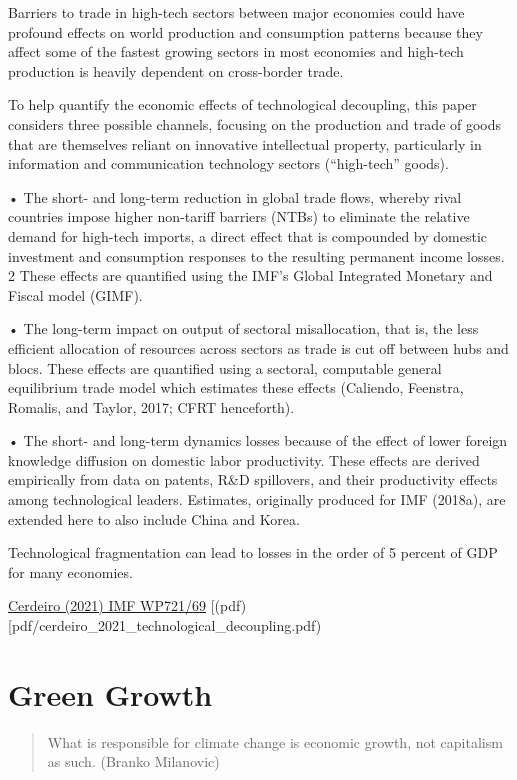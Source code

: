 \documentclass[
]{book}
\begin{document}
Barriers to trade in high-tech sectors
between major economies could have
profound effects on world production
and consumption patterns because they
affect some of the fastest growing
sectors in most economies and high-tech
production is heavily dependent on
cross-border trade.

To help quantify the economic effects of technological decoupling, this paper considers three
possible channels, focusing on the production and trade of goods that are themselves reliant on
innovative intellectual property, particularly in information and communication technology
sectors (``high-tech'' goods).

• The short- and long-term reduction in global trade flows, whereby rival countries impose
higher non-tariff barriers (NTBs) to eliminate the relative demand for high-tech imports,
a direct effect that is compounded by domestic investment and consumption responses to
the resulting permanent income losses. 2 These effects are quantified using the IMF's
Global Integrated Monetary and Fiscal model (GIMF).

• The long-term impact on output of sectoral misallocation, that is, the less efficient
allocation of resources across sectors as trade is cut off between hubs and blocs. These
effects are quantified using a sectoral, computable general equilibrium trade model which
estimates these effects (Caliendo, Feenstra, Romalis, and Taylor, 2017; CFRT
henceforth).

• The short- and long-term dynamics losses because of the effect of lower foreign
knowledge diffusion on domestic labor productivity. These effects are derived empirically
from data on patents, R\&D spillovers, and their productivity effects among technological
leaders. Estimates, originally produced for IMF (2018a), are extended here to also
include China and Korea.

Technological fragmentation can lead to losses in the order of 5 percent of GDP for many economies.

\href{https://www.imf.org/en/Publications/WP/Issues/2021/03/12/Sizing-Up-the-Effects-of-Technological-Decoupling-50125}{Cerdeiro (2021) IMF WP721/69}
{[}(pdf){[}pdf/cerdeiro\_2021\_technological\_decoupling.pdf)

\hypertarget{green-growth}{%
\chapter{Green Growth}\label{green-growth}}

\begin{quote}
What is responsible for climate change is economic growth, not capitalism as such. (Branko Milanovic)
\end{quote}
\end{document}
